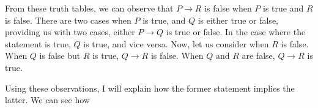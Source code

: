 \documentclass[hidelinks]{article}
\begin{document}
From these truth tables, we can observe that $P \to R$ is false when $P$ is true and $R$ is false. There are two cases when $P$ is true, and $Q$ is either true or false, providing us with two cases, either $P \to Q$ is true or false. In the case where the statement is true, $Q$ is true, and vice versa. Now, let us consider when $R$ is false. When $Q$ is false but $R$ is true, $Q \to R$ is false. When $Q \text{ and } R$ are false, $Q \to R$ is true.

Using these observations, I will explain how the former statement implies the latter. We can see how  
\end{document}
